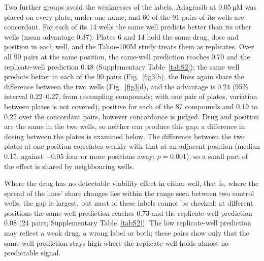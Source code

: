 \documentclass[pdflatex,sn-nature]{sn-jnl}
\begin{document}
Two further groups avoid the weaknesses of the labels. Adagrasib at 0.05\,µM was placed on every plate, under one name, and 60 of the 91 pairs of its wells are concordant. For each of its 14 wells the same well predicts better than its other wells (mean advantage 0.37). Plates 6 and 14 hold the same drug, dose and position in each well, and the Tahoe-100M study treats them as replicates\cite{zhang2026}. Over all 90 pairs at the same position, the same-well prediction reaches 0.70 and the replicate-well prediction 0.48 (Supplementary Table~\ref{tabS2}); the same well predicts better in each of the 90 pairs (Fig.~\ref{fig3}b), the lines again share the difference between the two wells (Fig.~\ref{fig3}d), and the advantage is 0.24 (95\% interval 0.22--0.27, from resampling compounds; with one pair of plates, variation between plates is not covered), positive for each of the 87 compounds and 0.19 to 0.22 over the concordant pairs, however concordance is judged. Drug and position are the same in the two wells, so neither can produce this gap; a difference in dosing between the plates is examined below. The difference between the two plates at one position correlates weakly with that at an adjacent position (median 0.15, against $-0.05$ four or more positions away; $p=0.001$), so a small part of the effect is shared by neighbouring wells.

Where the drug has no detectable viability effect in either well, that is, where the spread of the lines' share changes lies within the range seen between two control wells, the gap is largest, but most of these labels cannot be checked: at different positions the same-well prediction reaches 0.73 and the replicate-well prediction 0.08 (24 pairs; Supplementary Table~\ref{tabS2}). The low replicate-well prediction may reflect a weak drug, a wrong label or both; these pairs show only that the same-well prediction stays high where the replicate well holds almost no predictable signal.
\end{document}
